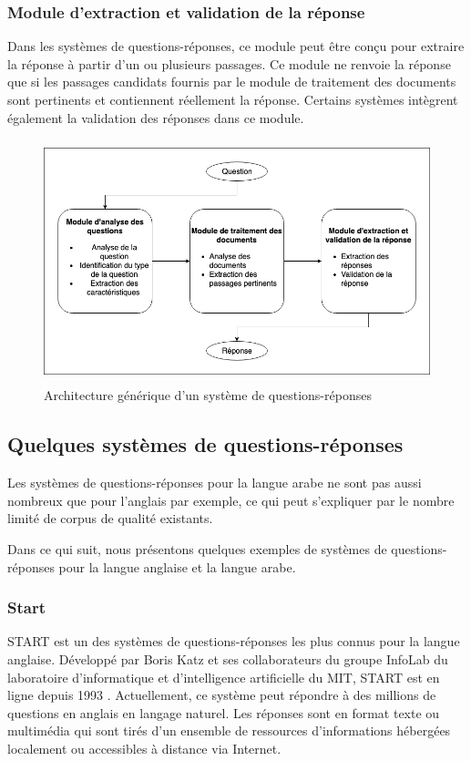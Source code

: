 \subsubsection{Module d'extraction et validation de la réponse}  
Dans les systèmes de questions-réponses, ce module peut être conçu pour extraire la réponse à partir d'un ou plusieurs passages. Ce module ne renvoie la réponse que si les passages candidats fournis par le module de traitement des documents sont pertinents et contiennent réellement la réponse. Certains systèmes intègrent également la validation des réponses dans ce module. 
\begin{figure}[H]
    \centering
    \includegraphics[height=200pt,width=325pt]{images/chap1/QAS_archi.png}
    \caption{Architecture générique d'un système de questions-réponses}
    \label{ArchiQAS}
\end{figure}


\subsection{Quelques systèmes de questions-réponses}
Les systèmes de questions-réponses pour la langue arabe ne sont pas aussi nombreux que pour l'anglais par exemple, ce qui peut s'expliquer par le nombre limité de corpus de qualité existants.

Dans ce qui suit, nous présentons quelques exemples de systèmes de questions-réponses pour la langue anglaise et la langue arabe.


\subsubsection{Start}
START est un des systèmes de questions-réponses les plus connus pour la langue anglaise. Développé par Boris Katz et ses collaborateurs du groupe InfoLab du laboratoire d'informatique et d'intelligence artificielle du MIT, START est en ligne depuis 1993 \cite{StartPaper}. Actuellement, ce système peut répondre à des millions de questions en anglais en langage naturel. Les réponses sont en format texte ou multimédia qui sont tirés d'un ensemble de ressources d'informations hébergées localement ou accessibles à distance via Internet.

